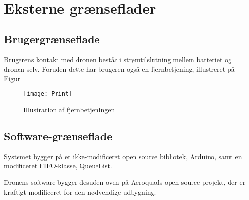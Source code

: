 \documentclass[Main]{subfiles}
\begin{document}
\chapter{Eksterne grænseflader}

\section{Brugergrænseflade}
Brugerens kontakt med dronen består i strømtilslutning mellem batteriet og dronen selv.
Foruden dette har brugeren også en fjernbetjening, illustreret på Figur 

\begin{figure}[H]
\centering
\texttt{[image: Print]}
\caption{Illustration af fjernbetjeningen}
\label{Fig:Fjernbetjening}
\end{figure}





\section{Software-grænseflade}
Systemet bygger på et ikke-modificeret open source bibliotek, Arduino\cite{Arduino}, samt en modificeret FIFO-klasse\cite{FIFO}, QueueList\cite{QueueList}.


Dronens software bygger desuden oven på Aeroquads open source projekt\cite{AQ-software}, der er kraftigt modificeret for den nødvendige udbygning.






%
\end{document}
